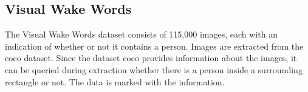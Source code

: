 %
%
%



\subsection{Visual Wake Words}

The \glqq Visual Wake Words\grqq{} dataset consists of 115,000 images, each with an indication of whether or not it contains a person. \cite{Chowdhery:2019} %
Images are extracted from the \ac{coco} dataset. Since the dataset \ac{coco} provides information about the images, it can be queried during extraction whether there is a person inside a surrounding rectangle or not. The data is marked with the information.




